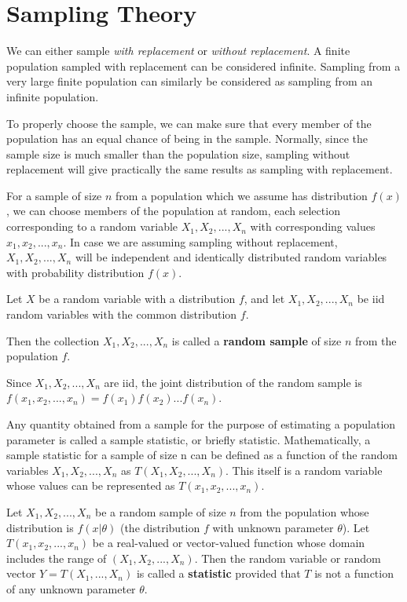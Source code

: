 \section{Sampling Theory}
We can either sample \textit{with replacement} or \textit{without replacement}. A finite population sampled with replacement can be considered infinite. Sampling from a very large finite population can similarly be considered as sampling from an infinite population. 

To properly choose the sample, we can make sure that every member of the population has an equal chance of being in the sample.
Normally, since the sample size is much smaller than the population size, sampling without replacement will give practically the same results as sampling with replacement.

For a sample of size $n$ from a population which we assume has distribution $f(x)$, we can choose members of the population at random, each selection corresponding to a random variable $X_1, X_2, ..., X_n$ with corresponding values $x_1, x_2, ..., x_n$. In case we are assuming sampling without replacement, $X_1, X_2, ..., X_n$ will be independent and identically distributed random variables with probability distribution $f(x)$.

\begin{defn}
Let $X$ be a random variable with a distribution $f$, and let $X_1, X_2, ..., X_n$ be iid random variables with the common distribution $f$.

Then the collection $X_1, X_2, ..., X_n$ is called a \textbf{random sample} of size $n$ from the population $f$.
\end{defn}

Since $X_1, X_2, ..., X_n$ are iid, the joint distribution of the random sample is \\
$f(x_1, x_2, ..., x_n) = f(x_1) f(x_2) ... f(x_n)$.

Any quantity obtained from a sample for the purpose of estimating a population parameter is called a sample
statistic, or briefly statistic. Mathematically, a sample statistic for a sample of size n can be defined as a function of the random variables $X_1, X_2, ..., X_n$ as $T(X_1, X_2, ..., X_n)$. This itself is a random variable whose values can be represented as $T(x_1, x_2, ..., x_n)$.

\begin{defn}
    Let $X_1, X_2, ..., X_n$ be a random sample of size $n$ from the population whose distribution is $f\left (x|\theta\right )$ (the distribution $f$ with unknown parameter $\theta$). Let $T\left (x_1, x_2, ...,x_n\right )$ be a real-valued or vector-valued function whose domain includes the range of $\left (X_1, X_2, ..., X_n\right )$. Then the random variable or random vector $Y = T\left (X_1, ..., X_n\right )$ is called a \textbf{statistic} provided that $T$ is not a function of any unknown parameter $\theta$.
\end{defn}

